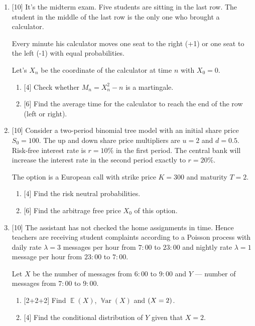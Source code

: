 \documentclass[12pt]{article}
\DeclareMathOperator{\Var}{\mathbb{V}ar}
\let\P\relax
\DeclareMathOperator{\P}{\mathbb{P}}
\DeclareMathOperator{\E}{\mathbb{E}}
\begin{document}
\begin{enumerate}
    
    \newpage
    \item {[10]} It's the midterm exam.
    Five students are sitting in the last row. 
    The student in the middle of the last row is the only one who brought a calculator. 
    
    Every minute his calculator moves one seat to the right (+1) or one seat to the left (-1) with equal probabilities.

    Let's $X_n$ be the coordinate of the calculator at time $n$ with $X_0 = 0$.
    \begin{enumerate}
        \item {[4]} Check whether $M_n = X_n^2 - n$ is a martingale.
        \item {[6]} Find the average time for the calculator to reach the end of the row (left or right).
    \end{enumerate}

    \item {[10]} Consider a two-period binomial tree model with an initial share price $S_0 = 100$. 
    The up and down share price multipliers are $u = 2$ and $d = 0.5$. 
    Risk-free interest rate is $r = 10\%$ in the first period. 
    The central bank will increase the interest rate in the second period exactly to $r = 20\%$.

    The option is a European call with strike price $K = 300$ and maturity $T = 2$. 
    
    \begin{enumerate}
        \item {[4]} Find the risk neutral probabilities.
        \item {[6]} Find the arbitrage free price $X_0$ of this option.
    \end{enumerate}

    \item {[10]} The assistant has not checked the home assignments in time. 
    Hence teachers are receiving student complaints according to a Poisson process with daily rate $\lambda = 3$ messages per hour from $7:00$ to $23:00$ and 
    nightly rate $\lambda = 1$ message per hour from $23:00$ to $7:00$.

    Let $X$ be the number of messages from $6:00$ to $9:00$ and $Y$ — number of messages from $7:00$ to $9:00$.
    \begin{enumerate}
        \item {[2+2+2]} Find $\E(X)$, $\Var(X)$ and $\P(X = 2)$.
        \item {[4]} Find the conditional distribution of $Y$ given that $X = 2$.
    \end{enumerate}


\end{enumerate}
\end{document}
